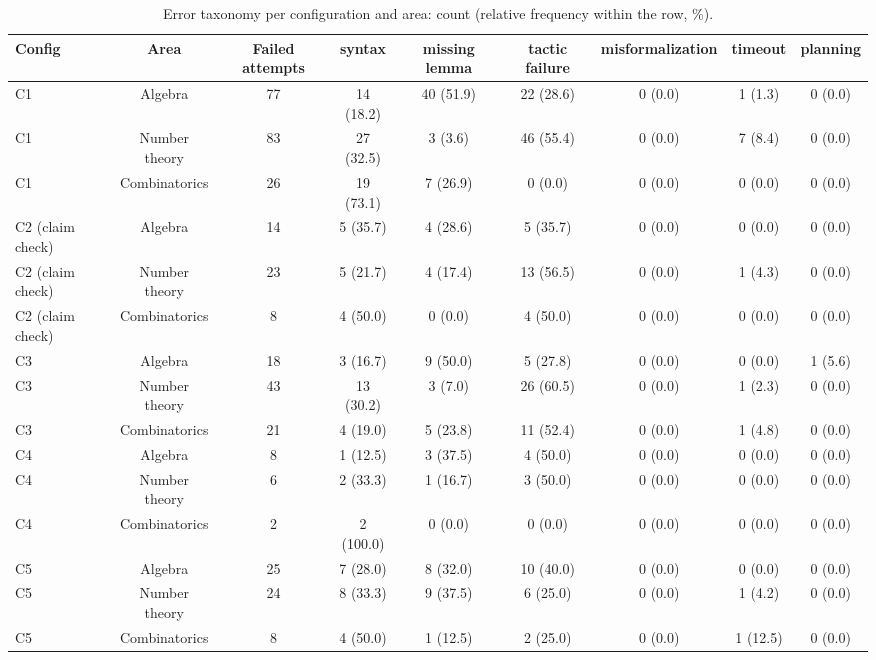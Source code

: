 \begin{table}[t]
\centering
\scriptsize
\setlength{\tabcolsep}{3pt}
\caption{Error taxonomy per configuration and area: count (relative frequency within the row, \%).}
\label{tab:kappa-area}
\begin{tabular}{lcccccccc}
\toprule
Config & Area & Failed attempts & syntax & missing lemma & tactic failure & misformalization & timeout & planning \\
\midrule
C1 & Algebra & 77 & 14 (18.2) & 40 (51.9) & 22 (28.6) & 0 (0.0) & 1 (1.3) & 0 (0.0) \\
C1 & Number theory & 83 & 27 (32.5) & 3 (3.6) & 46 (55.4) & 0 (0.0) & 7 (8.4) & 0 (0.0) \\
C1 & Combinatorics & 26 & 19 (73.1) & 7 (26.9) & 0 (0.0) & 0 (0.0) & 0 (0.0) & 0 (0.0) \\
\midrule
C2 (claim check) & Algebra & 14 & 5 (35.7) & 4 (28.6) & 5 (35.7) & 0 (0.0) & 0 (0.0) & 0 (0.0) \\
C2 (claim check) & Number theory & 23 & 5 (21.7) & 4 (17.4) & 13 (56.5) & 0 (0.0) & 1 (4.3) & 0 (0.0) \\
C2 (claim check) & Combinatorics & 8 & 4 (50.0) & 0 (0.0) & 4 (50.0) & 0 (0.0) & 0 (0.0) & 0 (0.0) \\
\midrule
C3 & Algebra & 18 & 3 (16.7) & 9 (50.0) & 5 (27.8) & 0 (0.0) & 0 (0.0) & 1 (5.6) \\
C3 & Number theory & 43 & 13 (30.2) & 3 (7.0) & 26 (60.5) & 0 (0.0) & 1 (2.3) & 0 (0.0) \\
C3 & Combinatorics & 21 & 4 (19.0) & 5 (23.8) & 11 (52.4) & 0 (0.0) & 1 (4.8) & 0 (0.0) \\
\midrule
C4 & Algebra & 8 & 1 (12.5) & 3 (37.5) & 4 (50.0) & 0 (0.0) & 0 (0.0) & 0 (0.0) \\
C4 & Number theory & 6 & 2 (33.3) & 1 (16.7) & 3 (50.0) & 0 (0.0) & 0 (0.0) & 0 (0.0) \\
C4 & Combinatorics & 2 & 2 (100.0) & 0 (0.0) & 0 (0.0) & 0 (0.0) & 0 (0.0) & 0 (0.0) \\
\midrule
C5 & Algebra & 25 & 7 (28.0) & 8 (32.0) & 10 (40.0) & 0 (0.0) & 0 (0.0) & 0 (0.0) \\
C5 & Number theory & 24 & 8 (33.3) & 9 (37.5) & 6 (25.0) & 0 (0.0) & 1 (4.2) & 0 (0.0) \\
C5 & Combinatorics & 8 & 4 (50.0) & 1 (12.5) & 2 (25.0) & 0 (0.0) & 1 (12.5) & 0 (0.0) \\
\bottomrule
\end{tabular}
\end{table}

